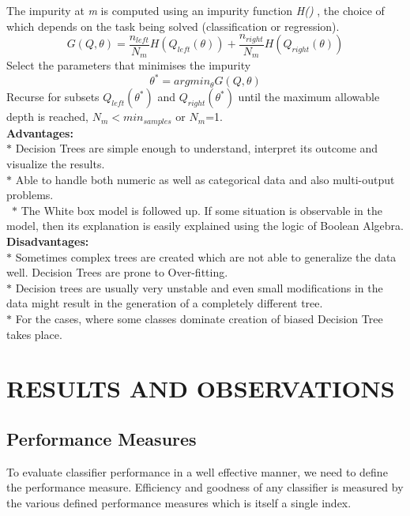 \documentclass[a4paper, 10pt, conference]{IEEEtran}
\begin{document}
The impurity at \textit{m} is computed using an impurity function \textit{H()} , the choice of which depends on the task being solved (classification or regression).
\[ G(Q,\theta) = \frac{n_{left}}{N_{m}}H(Q_{left}(\theta)) + \frac{n_{right}}{N_{m}}H(Q_{right}(\theta))
\]
Select the parameters that minimises the impurity
\[ \theta^{\ast} = arg min_{\theta}G(Q,\theta)
\]
Recurse for subsets \textit{$Q_{left}(\theta^{\ast})$} and \textit{$Q_{right}(\theta^{\ast})$} until the maximum allowable depth is reached, \textit{$N_{m}< min_{samples}$} or \textit{$N_{m}$}=1.
\\

\textbf{Advantages:}\\
\indent $\ast$ Decision Trees are simple enough to understand, interpret its outcome and visualize the results.\\
\indent $\ast$ Able to handle both numeric as well as categorical data and also multi-output problems.\\\
\indent $\ast$ The White box model is followed up. If some situation is observable in the model, then its explanation is easily explained using the logic of Boolean Algebra.\\

\textbf{Disadvantages:}\\
\indent $\ast$ Sometimes complex trees are created which are not able to generalize the data well. Decision Trees are prone to Over-fitting.\\
\indent $\ast$ Decision trees are usually very unstable and even small modifications in the data might result in the generation of a completely different tree.\\
\indent $\ast$ For the cases, where some classes dominate creation of biased Decision Tree takes place.\\


\section{RESULTS AND OBSERVATIONS}

\subsection{Performance Measures}
To evaluate classifier performance in a well effective manner, we need to define the performance measure. Efficiency and goodness of any classifier is measured by the various defined performance measures which is itself a single index.
\end{document}
